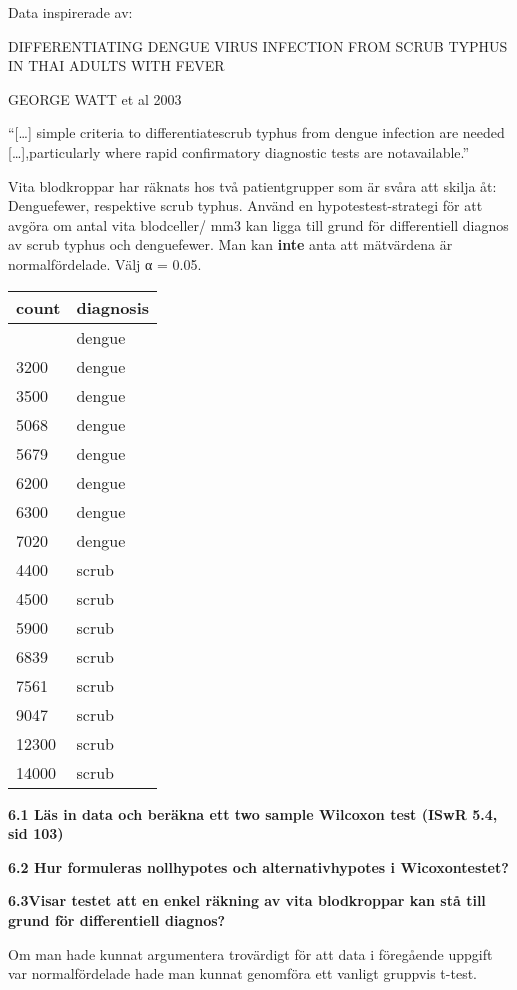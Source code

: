 \documentclass[
  letterpaper,
  DIV=11,
  numbers=noendperiod]{scrartcl}
\begin{document}
Data inspirerade av:

DIFFERENTIATING DENGUE VIRUS INFECTION FROM SCRUB TYPHUS IN THAI ADULTS
WITH FEVER

GEORGE WATT et al 2003

``{[}\ldots{]} simple criteria to differentiatescrub typhus from dengue
infection are needed {[}\ldots{]},particularly where rapid confirmatory
diagnostic tests are notavailable.''

Vita blodkroppar har räknats hos två patientgrupper som är svåra att
skilja åt: Denguefewer, respektive scrub typhus. Använd en
hypotestest-strategi för att avgöra om antal vita blodceller/ mm3 kan
ligga till grund för differentiell diagnos av scrub typhus och
denguefewer. Man kan \textbf{inte} anta att mätvärdena är
normalfördelade. Välj α = 0.05.

\begin{longtable}[]{@{}ll@{}}
\toprule\noalign{}
count & diagnosis \\
\midrule\noalign{}
\endhead
\bottomrule\noalign{}
\endlastfoot
3000 & dengue \\
3200 & dengue \\
3500 & dengue \\
5068 & dengue \\
5679 & dengue \\
6200 & dengue \\
6300 & dengue \\
7020 & dengue \\
4400 & scrub \\
4500 & scrub \\
5900 & scrub \\
6839 & scrub \\
7561 & scrub \\
9047 & scrub \\
12300 & scrub \\
14000 & scrub \\
\end{longtable}

\textbf{6.1 Läs in data och beräkna ett two sample Wilcoxon test (ISwR
5.4, sid 103)}

\textbf{6.2 Hur formuleras nollhypotes och alternativhypotes i
Wicoxontestet?}

\textbf{6.3Visar testet att en enkel räkning av vita blodkroppar kan stå
till grund för differentiell diagnos?}

Om man hade kunnat argumentera trovärdigt för att data i föregående
uppgift var normalfördelade hade man kunnat genomföra ett vanligt
gruppvis t-test.
\end{document}
